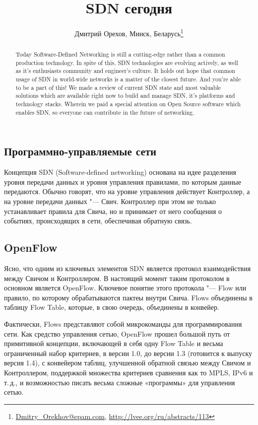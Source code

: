 \documentclass[10pt, a5paper]{article}
\begin{document}
\title{SDN сегодня}
\author{Дмитрий Орехов, Минск, Беларусь\footnote{\url{Dmitry_Orekhov@epam.com}, \url{http://lvee.org/ru/abstracts/113}}}
\maketitle
\begin{abstract}
Today Software-Defined Networking is still a cutting-edge rather than a common production technology. In spite of this, SDN technologies are evolving actively, as well as it's enthusiasts com\-mu\-ni\-ty and engineer's culture. It holds out hope that common usage of SDN in world-wide networks is a matter of the closest future. And you're able to be a part of this!
We made a review of current SDN state and most valuable solutions which are available right now to build and manage SDN, it's platforms and technology stacks. Wherein we paid a special attention on Open Source software which enables SDN, so everyone can contribute in the future of networking.
\end{abstract}
\subsection*{Программно-управляемые сети}

Концепция SDN (Software-defined networking) основана на идее разделения уровня передачи данных и уровня управления правилами, по которым данные передаются. Обычно говорят, что на уровне управления действует Контроллер, а на уровне передачи данных "--- Свич. Контроллер при этом не только устанавливает правила для Свича, но и принимает от него сообщения о событиях, происходящих в сети, обеспечивая обратную связь.

\subsection*{OpenFlow}

Ясно, что одним из ключевых элементов SDN является протокол взаимодействия между Свичом и Контроллером. В настоящий момент таким протоколом в основном является OpenFlow. Ключевое понятие этого протокола "--- Flow или правило, по которому обрабатываются пактеы внутри Свича. Flows объединены в таблицу Flow Table, которые, в свою очередь, объединены в конвейер.

Фактически, Flows представляют собой микрокоманды для программирования сети. Как средство управления сетью, OpenFlow прошел большой путь от примитивной концепции, включающей в себя одну Flow Table и весьма ограниченный набор критериев, в версии 1.0, до версии 1.3 (готовится к выпуску версия 1.4), с конвейером таблиц, улучшенной обратной связью между Свичом и Контроллером, поддержкой множества критериев сравнения как то MPLS, IPv6 и т.\,д., и возможностью писать весьма сложные «программы» для управления сетью.
\end{document}
